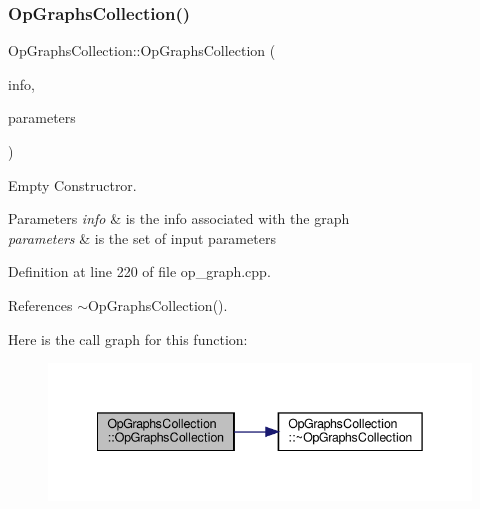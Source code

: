 \subsubsection{\texorpdfstring{Op\+Graphs\+Collection()}{OpGraphsCollection()}}
{\footnotesize\ttfamily Op\+Graphs\+Collection\+::\+Op\+Graphs\+Collection (\begin{DoxyParamCaption}\item[{const \hyperlink{op__graph_8hpp_aa53452ee6eef48921379dd17cb659724}{Op\+Graph\+Info\+Ref}}]{info,  }\item[{const \hyperlink{Parameter_8hpp_a37841774a6fcb479b597fdf8955eb4ea}{Parameter\+Const\+Ref}}]{parameters }\end{DoxyParamCaption})}



Empty Constructror. 


\begin{DoxyParams}{Parameters}
{\em info} & is the info associated with the graph \\
\hline
{\em parameters} & is the set of input parameters \\
\hline
\end{DoxyParams}


Definition at line 220 of file op\+\_\+graph.\+cpp.



References $\sim$\+Op\+Graphs\+Collection().

Here is the call graph for this function\+:
\nopagebreak
\begin{figure}[H]
\begin{center}
\leavevmode
\includegraphics[width=342pt]{da/df9/classOpGraphsCollection_aa142b89a687698e352260755e6e38632_cgraph}
\end{center}
\end{figure}
\mbox{\label{classOpGraphsCollection_aadeed6f2688a706898f7c417d8a01af6}} 
